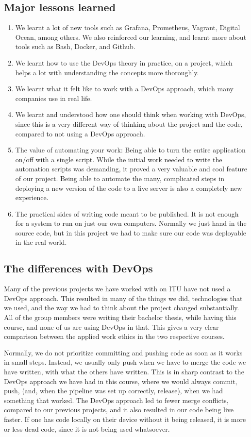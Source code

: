\subsection{Major lessons learned}
\begin{enumerate}
    \item We learnt a lot of new tools such as Grafana, Prometheus, Vagrant, Digital Ocean, among others. We also reinforced our learning, and learnt more about tools such as Bash, Docker, and Github.
    \item We learnt how to use the DevOps theory in practice, on a project, which helps a lot with understanding the concepts more thoroughly.
    \item We learnt what it felt like to work with a DevOps approach, which many companies use in real life.
    \item We learnt and understood how one should think when working with DevOps, since this is a very different way of thinking about the project and the code, compared to not using a DevOps approach.
    \item The value of automating your work: Being able to turn the entire application on/off with a single script. While the initial work needed to write the automation scripts was demanding, it proved a very valuable and cool feature of our project. Being able to automate the many, complicated steps in deploying a new version of the code to a live server is also a completely new experience.
    \item The practical sides of writing code meant to be published. It is not enough for a system to run on just our own computers. Normally we just hand in the source code, but in this project we had to make sure our code was deployable in the real world.
\end{enumerate}

\subsection{The differences with DevOps}
Many of the previous projects we have worked with on ITU have not used a DevOps approach. This resulted in many of the things we did, technologies that we used, and the way we had to think about the project changed substantially. All of the group members were writing their bachelor thesis, while having this course, and none of us are using DevOps in that. This gives a very clear comparison between the applied work ethics in the two respective courses. 

Normally, we do not prioritize committing and pushing code as soon as it works in small steps. Instead, we usually only push when we have to merge the code we have written, with what the others have written. This is in sharp contrast to the DevOps approach we have had in this course, where we would always commit, push, (and, when the pipeline was set up correctly, release), when we had something that worked. The DevOps approach led to fewer merge conflicts, compared to our previous projects, and it also resulted in our code being live faster. If one has code locally on their device without it being released, it is more or less dead code, since it is not being used whatsoever.
